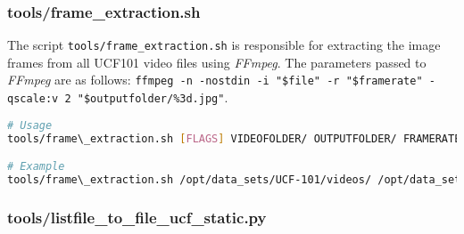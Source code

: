 \subsubsection{tools/frame\_extraction.sh}
\label{subsec:frame_extraction}
The script \texttt{tools/frame\_extraction.sh} is responsible for extracting the image frames from all UCF101 video files using \emph{FFmpeg}.
The parameters passed to \emph{FFmpeg} are as follows: \lstinline{ffmpeg -n -nostdin -i "$file" -r "$framerate" -qscale:v 2 "$outputfolder/%3d.jpg"}.
\begin{lstlisting}[language=sh, caption=convert\_image\_multi.sh, label=lst:convert_imageset]
# Usage
tools/frame\_extraction.sh [FLAGS] VIDEOFOLDER/ OUTPUTFOLDER/ FRAMERATE

# Example
tools/frame\_extraction.sh /opt/data_sets/UCF-101/videos/ /opt/data_sets/UCF-101/frames_10fps/ 10
\end{lstlisting}

\subsubsection{tools/listfile\_to\_file\_ucf\_static.py}
\label{subsec:listfile_to_file_ucf_static}